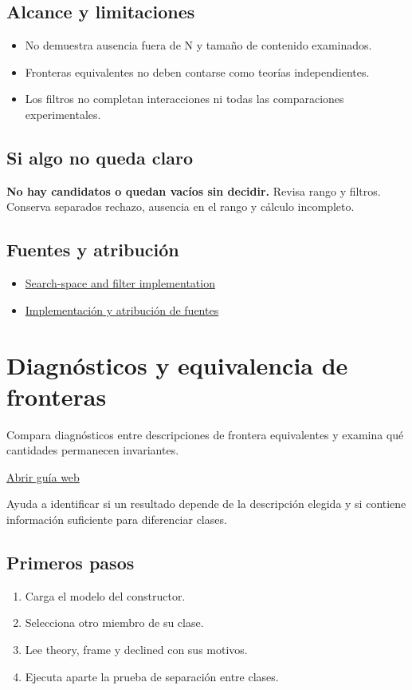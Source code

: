 \documentclass[11pt,a4paper]{article}
\begin{document}
\subsection*{Alcance y limitaciones}
\begin{itemize}
\item No demuestra ausencia fuera de N y tamaño de contenido examinados.
\item Fronteras equivalentes no deben contarse como teorías independientes.
\item Los filtros no completan interacciones ni todas las comparaciones experimentales.
\end{itemize}
\subsection*{Si algo no queda claro}
\textbf{No hay candidatos o quedan vacíos sin decidir.} Revisa rango y filtros. Conserva separados rechazo, ausencia en el rango y cálculo incompleto.

\subsection*{Fuentes y atribución}
\begin{itemize}
\item \href{https://github.com/karlesmarin/ghu-lab/blob/main/src/modules/sweep5d.mjs}{Search-space and filter implementation}
\item \href{https://github.com/karlesmarin/ghu-lab/blob/main/src/sections/sweep5d_section.js}{Implementación y atribución de fuentes}
\end{itemize}
\section{Diagnósticos y equivalencia de fronteras}
Compara diagnósticos entre descripciones de frontera equivalentes y examina qué cantidades permanecen invariantes.

\href{https://karlesmarin.github.io/ghu-explorer/guide/es/dossier/index.html}{Abrir guía web}

Ayuda a identificar si un resultado depende de la descripción elegida y si contiene información suficiente para diferenciar clases.
\subsection*{Primeros pasos}
\begin{enumerate}
\item Carga el modelo del constructor.
\item Selecciona otro miembro de su clase.
\item Lee theory, frame y declined con sus motivos.
\item Ejecuta aparte la prueba de separación entre clases.
\end{enumerate}
\end{document}

